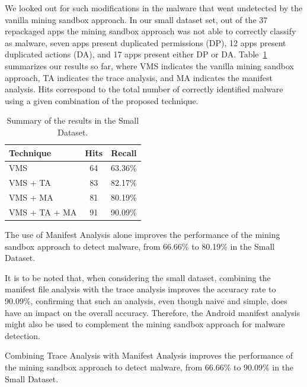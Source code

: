 We looked out for such modifications in the malware that went undetected by the
vanilla mining sandbox approach. In our small dataset set, out of the 37 repackaged apps the mining sandbox approach was not
able to correctly classify as malware, seven apps present duplicated permissions (DP), 12 apps present duplicated actions (DA), and
17 apps present either DP or DA. Table~\ref{tab:mfa} summarizes our results so far, where
VMS indicates the vanilla mining
sandbox approach, TA indicates the trace analysis, and MA indicates the manifest analysis.
Hits correspond to the total number of correctly identified malware using a given
combination of the proposed technique.

\begin{table}[ht]
  \centering
  \begin{small}
  \begin{tabular}{lcc}\toprule
  Technique      & Hits & Recall \\ \midrule 
  VMS            & 64   & \num{63.36}\% \\ 
  VMS + TA       & 83   & \num{82.17}\%  \\
  VMS + MA       & 81   & \num{80.19}\% \\
  VMS + TA + MA  & 91   & \num{90.09}\% \\  \bottomrule
  \end{tabular}
  \end{small}
    \caption{Summary of the results in the Small Dataset.}
 \label{tab:mfa}
\end{table}

\begin{obs}{2}{}
  The use of Manifest Analysis alone improves the performance
  of the mining sandbox approach to detect malware,
  from \num{66.66}\% to \num{80.19}\% in the
  Small Dataset. 
\end{obs}


It is to be noted that, when considering the small dataset, combining the manifest file analysis with the trace analysis
improves the accuracy rate to $90.09\%$, confirming that such an analysis, even though naive and simple,
does have an impact on the overall accuracy. Therefore, the Android manifest
analysis might also be used to complement the mining sandbox approach for malware detection.  


\begin{obs}{3}{}
  Combining Trace Analysis with Manifest Analysis improves the performance
  of the mining sandbox approach to detect malware,
  from \num{66.66}\% to \num{90.09}\% in the
  Small Dataset. 
\end{obs}

